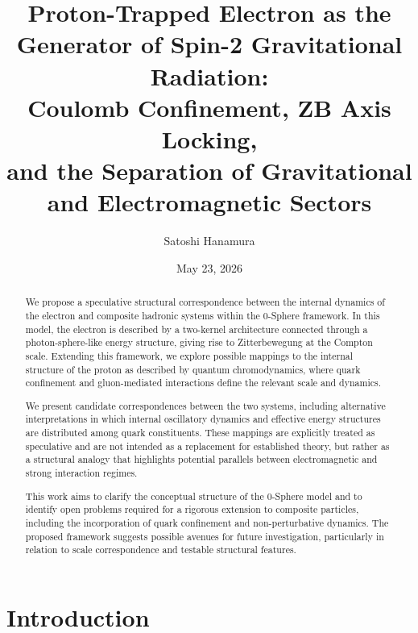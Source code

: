 \documentclass[%
 reprint, amsmath,amssymb, aps, prd, ]{revtex4-2}
\numberwithin{equation}{section}
\begin{document}

\title{Proton-Trapped Electron as the Generator of Spin-2 Gravitational Radiation:\\ Coulomb Confinement, ZB Axis Locking,\\ and the Separation of Gravitational and Electromagnetic Sectors}

\author{Satoshi Hanamura}
\date{May 23, 2026}

\begin{abstract}
We propose a speculative structural correspondence between the internal dynamics of the electron and composite hadronic systems within the 0-Sphere framework. In this model, the electron is described by a two-kernel architecture connected through a photon-sphere-like energy structure, giving rise to Zitterbewegung at the Compton scale. Extending this framework, we explore possible mappings to the internal structure of the proton as described by quantum chromodynamics, where quark confinement and gluon-mediated interactions define the relevant scale and dynamics.

We present candidate correspondences between the two systems, including alternative interpretations in which internal oscillatory dynamics and effective energy structures are distributed among quark constituents. These mappings are explicitly treated as speculative and are not intended as a replacement for established theory, but rather as a structural analogy that highlights potential parallels between electromagnetic and strong interaction regimes.

This work aims to clarify the conceptual structure of the 0-Sphere model and to identify open problems required for a rigorous extension to composite particles, including the incorporation of quark confinement and non-perturbative dynamics. The proposed framework suggests possible avenues for future investigation, particularly in relation to scale correspondence and testable structural features.

\end{abstract}

\maketitle

\section{Introduction}
\label{sec:intro}
\end{document}
